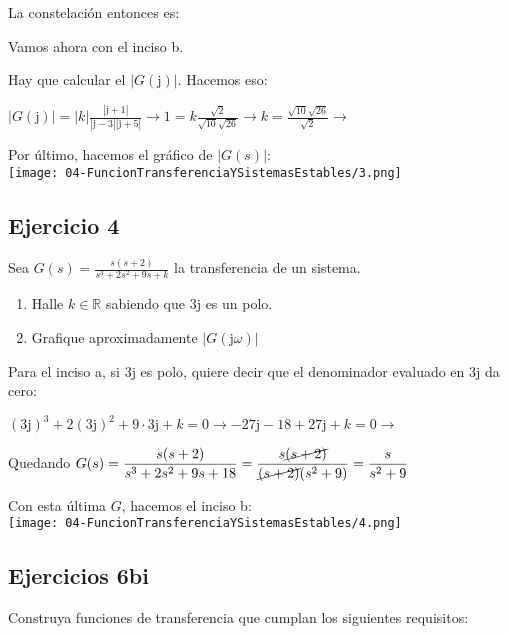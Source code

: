 \documentclass[11pt]{article}
\def\imj{\mathrm{j}}
\begin{document}
	La constelación entonces es:
	

	Vamos ahora con el inciso b.
	
	Hay que calcular el $|G(\imj)|$. Hacemos eso:
	
	$\displaystyle |G(\imj)|=|k|\frac{|\imj+1|}{|\imj-3||\imj+5|} \rightarrow 1=k\frac{\sqrt{2}}{\sqrt{10}\sqrt{26}}\rightarrow k=\frac{\sqrt{10} \sqrt{26}}{\sqrt{2}}\rightarrow$ 
	
	Por último, hacemos el gráfico de $|G(s)|$:\\
	\texttt{[image: 04-FuncionTransferenciaYSistemasEstables/3.png]}
	
	\subsection{Ejercicio 4}
	
	Sea $\displaystyle G(s)=\frac{s(s+2)}{s^3+2s^2+9s+k}$ la transferencia de un sistema.
	\begin{enumerate}[label=(\alph*)]
		\item Halle $k \in \mathbb{R}$ sabiendo que $3\imj$ es un polo.
		\item Grafique aproximadamente $|G(\imj \omega)|$
	\end{enumerate}

	Para el inciso a, si $3\imj$ es polo, quiere decir que el denominador evaluado en $3\imj$ da cero:
	
	$(3\imj)^3+2(3\imj)^2+9\cdot 3\imj+k=0 \rightarrow -27\imj -18 + 27\imj + k = 0 \rightarrow$ 
	
	Quedando $\displaystyle G(s)=\frac{s(s+2)}{s^3+2s^2+9s+18}=\frac{s\cancel{(s+2)}}{\cancel{(s+2)}(s^2+9)}=\frac{s}{s^2+9}$
	
	Con esta última $G$, hacemos el inciso b:\\
	\texttt{[image: 04-FuncionTransferenciaYSistemasEstables/4.png]}
	
	\subsection{Ejercicios 6bi}
	Construya funciones de transferencia que cumplan los siguientes requisitos:
	
\end{document}
